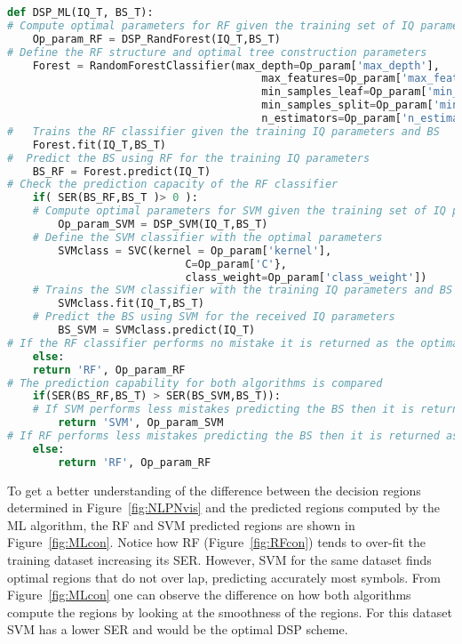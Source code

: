 \begin{lstlisting}[language=Python,caption=Machine learning enabled DSP scheme that  returns the best performing ML algorithm and its optimal parameter for the training dataset. ,label=lis:MLDSP]
def DSP_ML(IQ_T, BS_T):
# Compute optimal parameters for RF given the training set of IQ parameters
	Op_param_RF = DSP_RandForest(IQ_T,BS_T)
# Define the RF structure and optimal tree construction parameters
	Forest = RandomForestClassifier(max_depth=Op_param['max_depth'],
										max_features=Op_param['max_features'],
										min_samples_leaf=Op_param['min_samples_leaf'],
										min_samples_split=Op_param['min_samples_split'],
										n_estimators=Op_param['n_estimators'])
#	Trains the RF classifier given the training IQ parameters and BS
	Forest.fit(IQ_T,BS_T)
#  Predict the BS using RF for the training IQ parameters
	BS_RF = Forest.predict(IQ_T)
# Check the prediction capacity of the RF classifier 
	if( SER(BS_RF,BS_T )> 0 ):
	# Compute optimal parameters for SVM given the training set of IQ parameters and BS
		Op_param_SVM = DSP_SVM(IQ_T,BS_T)
	# Define the SVM classifier with the optimal parameters 
		SVMclass = SVC(kernel = Op_param['kernel'],
							C=Op_param['C'},
							class_weight=Op_param['class_weight'])
	# Trains the SVM classifier with the training IQ parameters and BS      
		SVMclass.fit(IQ_T,BS_T)
	# Predict the BS using SVM for the received IQ parameters
		BS_SVM = SVMclass.predict(IQ_T)
# If the RF classifier performs no mistake it is returned as the optimal classifier
	else:
   	return 'RF', Op_param_RF
# The prediction capability for both algorithms is compared 
	if(SER(BS_RF,BS_T) > SER(BS_SVM,BS_T)):
	# If SVM performs less mistakes predicting the BS then it is returned as the optimal classifier
		return 'SVM', Op_param_SVM
# If RF performs less mistakes predicting the BS then it is returned as the optimal classifier
	else:
		return 'RF', Op_param_RF
\end{lstlisting}	

To get a better understanding of the difference between the decision regions determined in Figure~\ref{fig:NLPNvis} and the predicted regions computed by the ML algorithm, the RF and SVM predicted regions are shown in Figure~\ref{fig:MLcon}. Notice how RF (Figure~\ref{fig:RFcon}) tends to over-fit the training dataset increasing its SER. However, SVM for the same dataset finds optimal regions that do not over lap, predicting accurately most symbols. From Figure~\ref{fig:MLcon} one can observe the difference on how both algorithms compute the regions by looking at the smoothness of the regions. For this dataset SVM has a lower SER and would  be the optimal DSP scheme.

